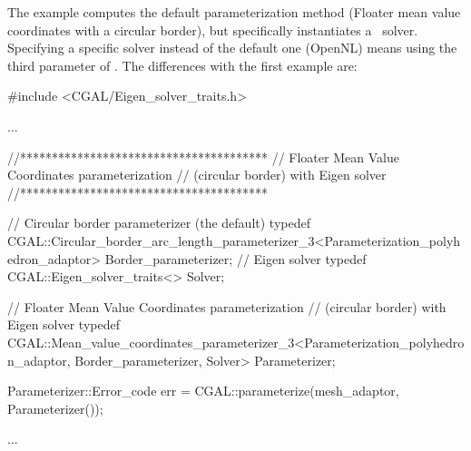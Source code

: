 The example  computes the
default parameterization method (Floater mean value coordinates with a circular border),
but specifically instantiates a \eigen\ solver. Specifying a specific solver
instead of the default one (OpenNL) means using the third parameter of
.  The differences with the first
example  are:

\begin{ccExampleCode}

#include <CGAL/Eigen_solver_traits.h>

...

//***************************************
// Floater Mean Value Coordinates parameterization
// (circular border) with Eigen solver
//***************************************

// Circular border parameterizer (the default)
typedef CGAL::Circular_border_arc_length_parameterizer_3<Parameterization_polyhedron_adaptor>
                                                    Border_parameterizer;
// Eigen solver
typedef CGAL::Eigen_solver_traits<>                 Solver;

// Floater Mean Value Coordinates parameterization
// (circular border) with Eigen solver
typedef CGAL::Mean_value_coordinates_parameterizer_3<Parameterization_polyhedron_adaptor,
                                                        Border_parameterizer,
                                                        Solver>
                                                    Parameterizer;

Parameterizer::Error_code err = CGAL::parameterize(mesh_adaptor, Parameterizer());

...

\end{ccExampleCode}

